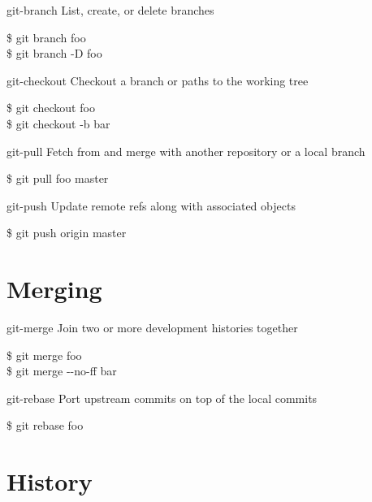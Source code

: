 \documentclass{beamer}
\begin{document}
\begin{frame}{git-branch}
  List, create, or delete branches
  \begin{Example}
    \$ git branch foo \\
    \$ git branch -D foo
  \end{Example}
\end{frame}

\begin{frame}{git-checkout}
  Checkout a branch or paths to the working tree
  \begin{Example}
    \$ git checkout foo \\
    \$ git checkout -b bar
  \end{Example}
\end{frame}

\begin{frame}{git-pull}
  Fetch from and merge with another repository or a local branch
  \begin{Example}
    \$ git pull foo master
  \end{Example}
\end{frame}

\begin{frame}{git-push}
  Update remote refs along with associated objects
  \begin{Example}
    \$ git push origin master
  \end{Example}
\end{frame}

\section{Merging}

\begin{frame}{git-merge}
  Join two or more development histories together
  \begin{Example}
    \$ git merge foo \\
    \$ git merge -{}-no-ff bar
  \end{Example}
\end{frame}

\begin{frame}{git-rebase}
  Port upstream commits on top of the local commits
  \begin{Example}
    \$ git rebase foo
  \end{Example}
\end{frame}

\section{History}
\end{document}
